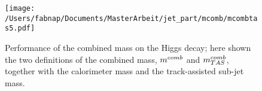 \begin{figure}[!ht]
  \centering
      \texttt{[image: /Users/fabnap/Documents/MasterArbeit/jet\_part/mcomb/mcombtas5.pdf]}
  \caption[$\mcombtas$ on the boosted Higgs]{Performance of the combined mass on the Higgs decay; here shown the two definitions of the combined mass, $m^{comb}$ and $\mcombtas$, together with the calorimeter mass and the track-assisted sub-jet mass.}
  \label{fig:mcombtas5}
\end{figure}

